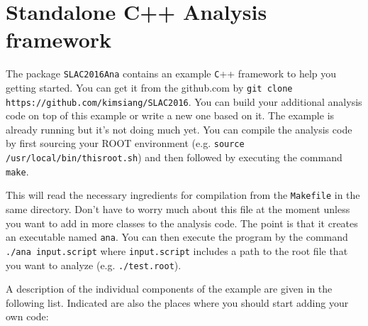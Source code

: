 \chapter{Standalone C++ Analysis framework}
\label{chap:four}

The package \verb+SLAC2016Ana+ contains an example \verb+C+++ framework to help you getting started. You can get it from the github.com by \verb+git clone https://github.com/kimsiang/SLAC2016+. You can build your additional analysis code on top of this example or write a new one based on it. The example is already running but it's not doing much yet. You can compile the analysis code by first sourcing your ROOT environment (e.g. \verb+source /usr/local/bin/thisroot.sh+) and then followed by executing the command \verb+make+.

This will read the necessary ingredients for compilation from the \verb+Makefile+ in the same directory. Don't have to worry much about this file at the moment unless you want to add in more classes to the analysis code.
The point is that it creates an executable named \verb+ana+. You can then execute the program by the command \verb+./ana input.script+ where \verb+input.script+ includes a path to the root file that you want to analyze (e.g. \verb+./test.root+). 

A description of the individual components of the example are given in the following list. Indicated are also the places where you should start adding your own code:

